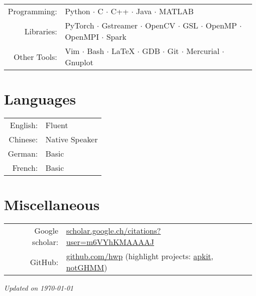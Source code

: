 \documentclass[a4paper,9pt]{extarticle} %
\begin{document}
\begin{tabular}{rl}
  Programming: & Python $\cdotp$ C $\cdotp$ C++ $\cdotp$ Java $\cdotp$ MATLAB \\
  Libraries: & PyTorch $\cdotp$ Gstreamer $\cdotp$ OpenCV $\cdotp$ GSL $\cdotp$ OpenMP $\cdotp$ OpenMPI $\cdotp$ Spark \\
  Other Tools: & Vim $\cdotp$ Bash $\cdotp$ \LaTeX{} $\cdotp$ GDB $\cdotp$ Git $\cdotp$ Mercurial $\cdotp$ Gnuplot \\
\end{tabular}


\section{Languages}

\begin{tabular}{rl}
  English: & Fluent \\
  Chinese: & Native Speaker \\
  German: & Basic \\
  French: & Basic \\
\end{tabular}

\section{Miscellaneous}

\begin{tabular}{rl}
  Google scholar: & \href{https://scholar.google.ch/citations?user=m6VYhKMAAAAJ&hl=en}{scholar.google.ch/citations?user=m6VYhKMAAAAJ} \\
  GitHub: & \href{https://github.com/hwp}{github.com/hwp} (highlight projects: \href{https://github.com/hwp/apkit}{apkit}, \href{https://github.com/hwp/notGHMM}{notGHMM}) \\
\end{tabular}



\vfill
\centering \footnotesize \itshape{Updated on \today}
\end{document}
